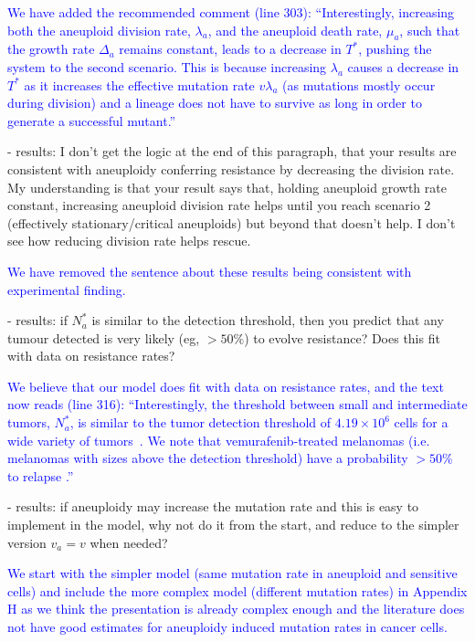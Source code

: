 \documentclass[12pt]{extarticle}
\begin{document}
\textcolor{blue}{%
We have added the recommended comment (line 303): ``Interestingly, increasing both the aneuploid division rate, $\lambda_a$, and the aneuploid death rate, $\mu_a$, such that the growth rate $\Delta_a$ remains constant, leads to a decrease in $T^*$, pushing the system to the second scenario. This is because increasing $\lambda_a$ causes a decrease in $T^*$ as  it increases the effective mutation rate $v\lambda_a$ (as mutations mostly occur during division) and a lineage does not have to survive as long in order to generate a successful mutant.''
} 

- results: I don't get the logic at the end of this paragraph, that your results are consistent with aneuploidy conferring resistance by decreasing the division rate. My understanding is that your result says that, holding aneuploid growth rate constant, increasing aneuploid division rate helps until you reach scenario 2 (effectively stationary/critical aneuploids) but beyond that doesn't help. I don't see how reducing division rate helps rescue.

\textcolor{blue}{%
We have removed the sentence about these results being consistent with experimental finding.
} 

- results: if $N_a^*$ is similar to the detection threshold, then you predict that any tumour detected is very likely (eg, $>50\%$) to evolve resistance? Does this fit with data on resistance rates?

\textcolor{blue}{ %
We believe that our model does fit with data on resistance rates, and the text now reads (line 316): ``Interestingly, the threshold between small and intermediate tumors, $N_a^*$, is similar to the tumor detection threshold of $4.19 \times 10^6$ cells for a wide variety of tumors~\citep{avanzini2019cancer}. We note that vemurafenib-treated melanomas (i.e. melanomas with sizes above the detection threshold) have a probability $>50\%$ to relapse \citep{piejko2023long,handa2022long}.''
}

- results: if aneuploidy may increase the mutation rate and this is easy to implement in the model, why not do it from the start, and reduce to the simpler version $v_a=v$ when needed?

\textcolor{blue}{
We start with the simpler model (same mutation rate in aneuploid and sensitive cells) and include the more complex model (different mutation rates) in Appendix H as we think the presentation is already complex enough and the literature does not have good estimates for aneuploidy induced mutation rates in cancer cells.
} 
\end{document}
